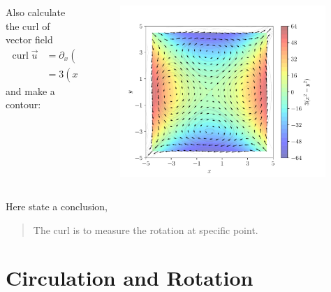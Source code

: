 \documentclass[11pt,]{beamer}
\begin{document}
\begin{frame}
	\begin{columns}[t]
		\begin{column}{0.5\textwidth}
			Also calculate the curl of vector field
			\begin{equation}
			\begin{aligned}
			\operatorname{curl} \vec{u} 
			&= \partial_{x}(x^3-9x)  - \partial_{y}(y^3-9y)\\
			&=3(x^3-y^2),
			\end{aligned}
			\end{equation}
			and make a contour:
		\end{column}
		\begin{column}{0.5\textwidth}
		\begin{figure}
	\includegraphics[page=1,width=0.98\textwidth]{flow-countour.pdf}
	\end{figure}
		\end{column}

	\end{columns}
	Here state a conclusion,
	\begin{quote}
	\bigskip
	The curl is to measure the rotation at specific point.
	\end{quote}
\end{frame}

\section{Circulation and Rotation}
\end{document}
